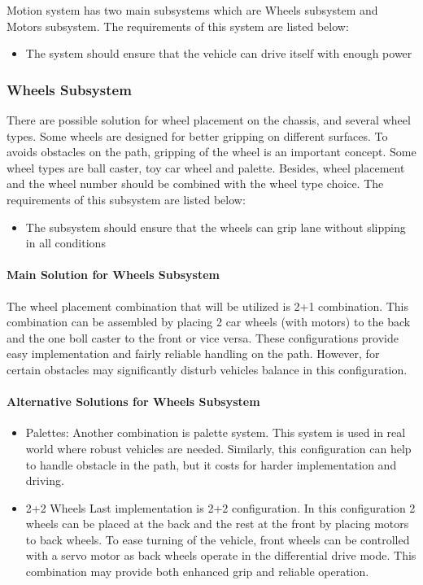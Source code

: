 \documentclass[a4paper,12pt]{article}
\begin{document}
	Motion system has two main subsystems which are Wheels subsystem and Motors subsystem. The requirements of this system are listed below:
	\begin{itemize}
		\item The system should	ensure that the vehicle can drive itself with enough power
	\end{itemize}
	
	
	
	\subsubsection{Wheels Subsystem}
	There are possible solution for wheel placement on the chassis, and several wheel types. Some wheels are designed for better gripping on different surfaces. To avoids obstacles on the path, gripping of the wheel is an important concept. Some wheel types are ball caster, toy car wheel and palette. Besides, wheel placement and the wheel number should be combined with the wheel type choice. The requirements of this subsystem are listed below:
	\begin{itemize}
		\item The subsystem should ensure that the wheels can grip lane without slipping in all conditions 	
	\end{itemize}
	
	\paragraph{Main Solution for Wheels Subsystem}
	
	The wheel placement combination that will be utilized is 2+1 combination. This combination can be assembled by placing 2 car wheels (with motors) to the back and the one boll caster to the front or vice versa. These configurations provide easy implementation and fairly reliable handling on the path. However, for certain obstacles may significantly disturb vehicles balance in this configuration.\\
	
	\paragraph{Alternative Solutions for Wheels Subsystem}
	
	\begin{itemize}
		\item{Palettes:} 	Another combination is palette system. This system is used in real world where robust vehicles are needed. Similarly, this configuration can help to handle obstacle in the path, but it costs for harder implementation and driving.
		
		\item{2+2 Wheels} 	Last implementation is 2+2 configuration. In this configuration 2 wheels can be placed at the back and the rest at the front by placing motors to back wheels. To ease turning of the vehicle, front wheels can be controlled with a servo motor as back wheels operate in the differential drive mode. This combination may provide both enhanced grip and reliable	 operation.
	\end{itemize}
\end{document}
